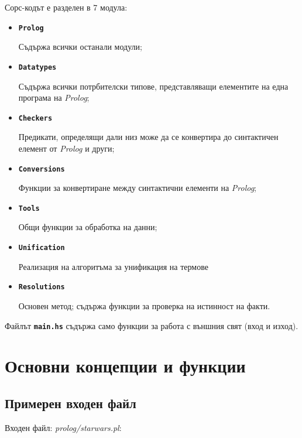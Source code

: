 \documentclass[15pt]{extarticle}
\begin{document}
	Сорс-кодът е разделен в 7 модула:
	\begin{itemize}
		
		\item \textbf{\texttt{Prolog}}
		
		Съдържа всички останали модули;
		
		\item \textbf{\texttt{Datatypes}}
		
		Съдържа всички потрбителски типове, представляващи елементите на една програма на \emph{Prolog};
		
		\item \textbf{\texttt{Checkers}}
		
		Предикати, определящи дали низ може да се конвертира до синтактичен елемент от \emph{Prolog} и други;
		
		\item \textbf{\texttt{Conversions}}
		
		Функции за конвертиране между синтактични елементи на \emph{Prolog};
		
		\item \textbf{\texttt{Tools}}
		
		Общи функции за обработка на данни;
		
		\item \textbf{\texttt{Unification}}
		
		Реализация на алгоритъма за унификация на термове
		
		\item \textbf{\texttt{Resolutions}}
		
		Основен метод; съдържа функции за проверка на истинност на факти.
		
	\end{itemize}

	Файлът \textbf{\texttt{main.hs}} съдържа само функции за работа с външния свят (вход и изход).
	
	\section{Основни концепции и функции}
	
	\subsection{Примерен входен файл}
	
	Входен файл: \emph{prolog/starwars.pl}:
	
\end{document}
